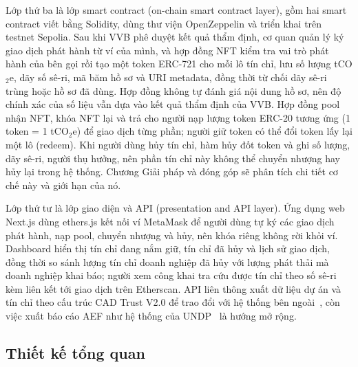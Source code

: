 Lớp thứ ba là lớp smart contract (on-chain smart contract layer), gồm hai smart contract viết bằng Solidity, dùng thư viện OpenZeppelin và triển khai trên testnet Sepolia. Sau khi VVB phê duyệt kết quả thẩm định, cơ quan quản lý ký giao dịch phát hành từ ví của mình, và hợp đồng NFT kiểm tra vai trò phát hành của bên gọi rồi tạo một token ERC-721 cho mỗi lô tín chỉ, lưu số lượng tCO$_2$e, dãy số sê-ri, mã băm hồ sơ và URI metadata, đồng thời từ chối dãy sê-ri trùng hoặc hồ sơ đã dùng. Hợp đồng không tự đánh giá nội dung hồ sơ, nên độ chính xác của số liệu vẫn dựa vào kết quả thẩm định của VVB. Hợp đồng pool nhận NFT, khóa NFT lại và trả cho người nạp lượng token ERC-20 tương ứng (1 token = 1 tCO$_2$e) để giao dịch từng phần; người giữ token có thể đổi token lấy lại một lô (redeem). Khi người dùng hủy tín chỉ, hàm hủy đốt token và ghi số lượng, dãy sê-ri, người thụ hưởng, nên phần tín chỉ này không thể chuyển nhượng hay hủy lại trong hệ thống. Chương Giải pháp và đóng góp sẽ phân tích chi tiết cơ chế này và giới hạn của nó.

Lớp thứ tư là lớp giao diện và API (presentation and API layer). Ứng dụng web Next.js dùng ethers.js kết nối ví MetaMask để người dùng tự ký các giao dịch phát hành, nạp pool, chuyển nhượng và hủy, nên khóa riêng không rời khỏi ví. Dashboard hiển thị tín chỉ đang nắm giữ, tín chỉ đã hủy và lịch sử giao dịch, đồng thời so sánh lượng tín chỉ doanh nghiệp đã hủy với lượng phát thải mà doanh nghiệp khai báo; người xem công khai tra cứu được tín chỉ theo số sê-ri kèm liên kết tới giao dịch trên Etherscan. API liên thông xuất dữ liệu dự án và tín chỉ theo cấu trúc CAD Trust V2.0 để trao đổi với hệ thống bên ngoài~\cite{cadtrust2025datamodel}, còn việc xuất báo cáo AEF như hệ thống của UNDP~\cite{undp2024nationalregistry} là hướng mở rộng.

\HinhKienTruc

\subsection*{Thiết kế tổng quan}
\label{subsec:tk-tongquan}

